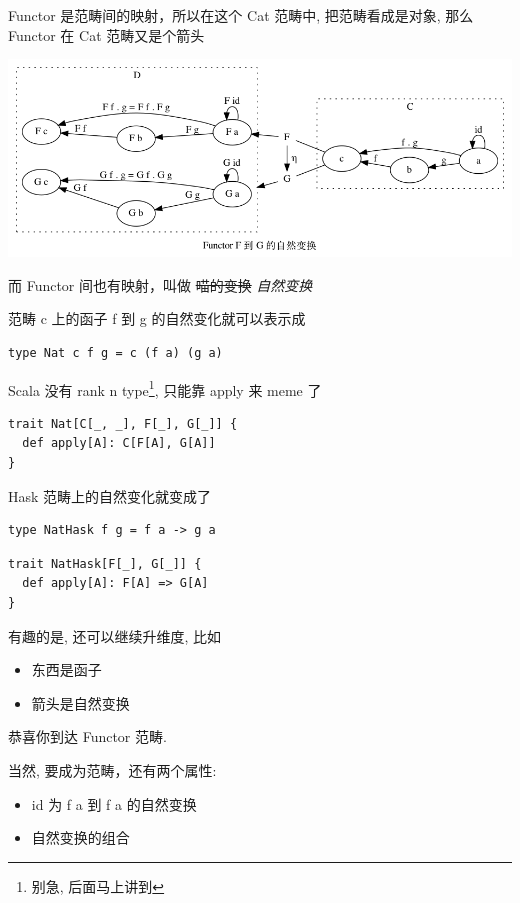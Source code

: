 \documentclass[11pt]{tufte-book}
\begin{document}
Functor 是范畴间的映射，所以在这个 Cat 范畴中, 把范畴看成是对象, 那么 Functor 在 Cat 范畴又是个箭头

\begin{center}
\includegraphics[width=.9\linewidth]{images/natrual-transformation.png}
\end{center}
而 Functor 间也有映射，叫做 \sout{喵的变换} \emph{自然变换}

范畴 c 上的函子 f 到 g 的自然变化就可以表示成
\begin{verbatim}
type Nat c f g = c (f a) (g a)
\end{verbatim}

Scala 没有 rank n type\footnote{别急, 后面马上讲到}, 只能靠 apply 来 meme 了
\begin{verbatim}
trait Nat[C[_, _], F[_], G[_]] {
  def apply[A]: C[F[A], G[A]]
}
\end{verbatim}

Hask 范畴上的自然变化就变成了

\begin{verbatim}
type NatHask f g = f a -> g a
\end{verbatim}

\begin{verbatim}
trait NatHask[F[_], G[_]] {
  def apply[A]: F[A] => G[A]
}

\end{verbatim}

有趣的是, 还可以继续升维度, 比如

\begin{itemize}
\item 东西是函子
\item 箭头是自然变换
\end{itemize}

恭喜你到达 Functor 范畴.

当然, 要成为范畴，还有两个属性:
\begin{itemize}
\item id 为 f a 到 f a 的自然变换
\item 自然变换的组合
\end{itemize}
\end{document}
